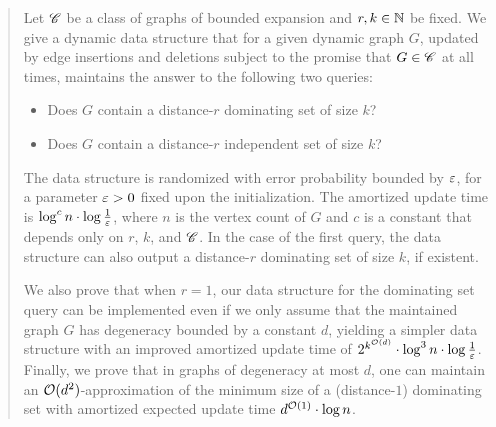 \begin{abstract}
	Let $\Cc$ be a class of graphs of bounded expansion and $r,k\in \N$ be fixed. We give a dynamic data structure that for a given dynamic graph $G$, updated by edge insertions and deletions subject to the promise that $G\in \Cc$ at all times, maintains the answer to the following two queries:
	\begin{itemize}[nosep]
		\item Does $G$ contain a distance-$r$ dominating set of size $k$?
		\item Does $G$ contain a distance-$r$ independent set of size $k$?
	\end{itemize}
	The data structure is randomized with error probability bounded by $\eps$, for a parameter $\eps>0$ fixed upon the initialization. The amortized update time is $\log^c n\cdot \log \frac{1}{\eps}$, where $n$ is the vertex count of $G$ and $c$ is a constant that depends only on $r$, $k$, and $\Cc$. In the case of the first query, the data structure can also output a distance-$r$ dominating set of size $k$, if existent.
	
	We also prove that when $r=1$, our data structure for the dominating set query can be implemented even if we only assume that the maintained graph $G$ has degeneracy bounded by a constant $d$, yielding a simpler data structure with an improved amortized update time of $2^{k^{\Oh(d)}}\cdot \log^3 n\cdot \log \tfrac{1}{\eps}$. Finally, we prove that in graphs of degeneracy at most $d$, one can maintain an $\Oh(d^2)$-approximation of the minimum size of a (distance-$1$) dominating set with amortized expected update time $d^{\Oh(1)}\cdot \log n$.
\end{abstract}